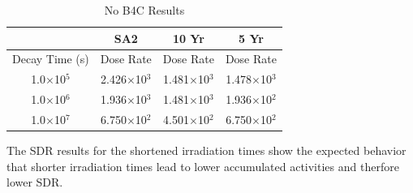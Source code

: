 \documentclass[12pt]{article}
\begin{document}
\begin{table}[ht!]
   \centering      
   \begin{tabular}{| c | c | c | c |}
      \hline
      & SA2 & 10 Yr & 5 Yr \\
      \hline
      Decay Time (s) & Dose Rate & Dose Rate & Dose Rate \\
      \hline
      1.0$\times$10$^{5}$ & 2.426$\times$10$^{3}$ & 1.481$\times$10$^{3}$ & 1.478$\times$10$^{3}$ \\
      1.0$\times$10$^{6}$ & 1.936$\times$10$^{3}$ & 1.481$\times$10$^{3}$ & 1.936$\times$10$^{2}$ \\
      1.0$\times$10$^{7}$ & 6.750$\times$10$^{2}$ & 4.501$\times$10$^{2}$ & 6.750$\times$10$^{2}$ \\
      \hline
\end{tabular}
\caption{No B4C Results}
\label{tab:nob4c_summary_scenario}
\end{table}

The SDR results for the shortened irradiation times show the expected behavior 
that shorter irradiation times lead to lower accumulated activities and therfore
lower SDR.  


\newpage


\newpage
\clearpage
\end{document}
